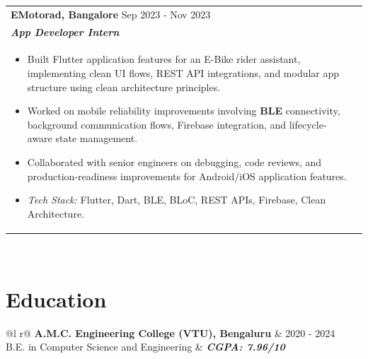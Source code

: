 \documentclass[a4paper,8pt]{article}
\begin{document}
\begin{tabularx}{\linewidth}{ @{}l r@{} }
\color[HTML]{1C033C} \textbf{EMotorad, Bangalore} \hfill \color[HTML]{371e77} Sep 2023 - Nov 2023 \\[4pt]
\color[HTML]{371e77}\textbf{\textit{App Developer Intern}} \hfill \color[HTML]{4B28A4} \\[5pt]
\begin{minipage}[t]{\linewidth}
    \begin{itemize}[nosep,after=\strut, leftmargin=2em, itemsep=2pt]
        \item Built Flutter application features for an E-Bike rider assistant, implementing clean UI flows, REST API integrations, and modular app structure using clean architecture principles.
        \item Worked on mobile reliability improvements involving \textbf{BLE} connectivity, background communication flows, Firebase integration, and lifecycle-aware state management.
        \item Collaborated with senior engineers on debugging, code reviews, and production-readiness improvements for Android/iOS application features.
        \item \textit{Tech Stack:} Flutter, Dart, BLE, BLoC, REST APIs, Firebase, Clean Architecture.
    \end{itemize}
    \end{minipage}
\end{tabularx}\\[3pt]

\section{Education}
\begin{tabularx}{\linewidth}{ @{}l r@{} }
\color[HTML]{1C033C} \textbf{A.M.C. Engineering College (VTU), Bengaluru} & \hfill \color[HTML]{371e77} 2020 - 2024 \\
\color[HTML]{371e77} B.E. in Computer Science and Engineering & \hfill \color[HTML]{4B28A4} \textit{\textbf{CGPA: 7.96/10}} \\
\end{tabularx}\\[3pt]

\end{document}
